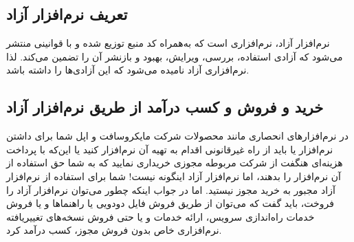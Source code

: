\documentclass{article}
\begin{document}
\subsection{تعریف نرم‌افزار آزاد}
نرم‌افزار آزاد، نرم‌افزاری است که به‌همراه کد منبع توزیع شده و با قوانینی منتشر می‌شود که آزادی استفاده، بررسی، ویرایش، بهبود و بازنشر آن را تضمین می‌کند. لذا نرم‌افزاری آزاد نامیده می‌شود که این آزادی‌ها را داشته باشد.
\subsection{خرید و فروش و کسب درآمد از طریق نرم‌افزار آزاد}

در نرم‌افزارهای انحصاری مانند محصولات شرکت مایکروسافت و اپل شما برای داشتن نرم‌افزار یا باید از راه غیر‌قانونی اقدام به تهیه آن نرم‌افزار کنید یا این‌که با پرداخت هزینه‌ای هنگفت از شرکت مربوطه مجوزی خریداری نمایید که به شما حق استفاده از آن نرم‌افزار را بدهند، اما نرم‌افزار آزاد اینگونه نیست! شما برای استفاده از نرم‌افزار آزاد مجبور به خرید مجوز نیستید. اما در جواب اینکه چطور می‌توان نرم‌افزار آزاد را فروخت، باید گفت که می‌توان از طریق فروش فایل دودویی یا راهنما‌ها و یا فروش خدمات راه‌اندازی سرویس، ارائه خدمات و یا حتی فروش نسخه‌های تغییر‌یافته نرم‌افزاری خاص بدون فروش مجوز، کسب در‌آمد کرد.
\end{document}

